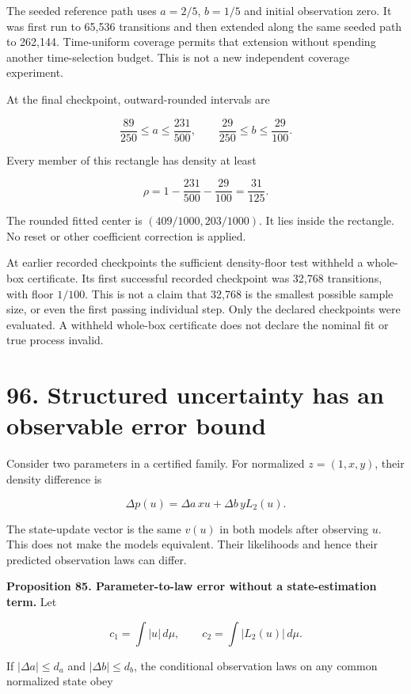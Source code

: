 \documentclass[11pt,letterpaper]{article}
\begin{document}
The seeded reference path uses \(a=2/5\), \(b=1/5\) and initial
observation zero. It was first run to 65,536 transitions and then
extended along the same seeded path to 262,144. Time-uniform coverage
permits that extension without spending another time-selection budget.
This is not a new independent coverage experiment.

At the final checkpoint, outward-rounded intervals are

\[
\boxed{
\frac{89}{250}\leq a\leq\frac{231}{500},
\qquad
\frac{29}{250}\leq b\leq\frac{29}{100}.
}
\]

Every member of this rectangle has density at least

\[
\rho=1-\frac{231}{500}-\frac{29}{100}=\frac{31}{125}.
\]

The rounded fitted center is \((409/1000,203/1000)\). It lies inside the
rectangle. No reset or other coefficient correction is applied.

At earlier recorded checkpoints the sufficient density-floor test
withheld a whole-box certificate. Its first successful recorded
checkpoint was 32,768 transitions, with floor \(1/100\). This is not a
claim that 32,768 is the smallest possible sample size, or even the
first passing individual step. Only the declared checkpoints were
evaluated. A withheld whole-box certificate does not declare the nominal
fit or true process invalid.

\section{96. Structured uncertainty has an observable error
bound}\label{structured-uncertainty-has-an-observable-error-bound}

Consider two parameters in a certified family. For normalized
\(z=(1,x,y)\), their density difference is

\[
\Delta p(u)=\Delta a\,x u+\Delta b\,yL_2(u).
\]

The state-update vector is the same \(v(u)\) in both models after
observing \(u\). This does not make the models equivalent. Their
likelihoods and hence their predicted observation laws can differ.

\textbf{Proposition 85. Parameter-to-law error without a
state-estimation term.} Let

\[
c_1=\int|u|\,d\mu,
\qquad c_2=\int|L_2(u)|\,d\mu.
\]

If \(|\Delta a|\leq d_a\) and \(|\Delta b|\leq d_b\), the conditional
observation laws on any common normalized state obey
\end{document}
